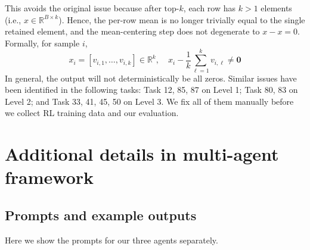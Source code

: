 This avoids the original issue because after $\mathrm{top}\text{-}k$, each row has $k>1$ elements (i.e., $x \in \mathbb{R}^{B \times k}$). Hence, the per-row mean is no longer trivially equal to the single retained element, and the mean-centering step does not degenerate to $x - x = 0$. Formally, for sample $i$,
\[
x_i = [v_{i,1}, \ldots, v_{i,k}] \in \mathbb{R}^k,\quad
x_i - \frac{1}{k}\sum_{\ell=1}^k v_{i,\ell} \neq \mathbf{0}
\]
In general, the output will not deterministically be all zeros.
Similar issues have been identified in the following tasks: Task 12, 85, 87 on Level 1; Task 80, 83 on Level 2; and Task 33, 41, 45, 50 on Level 3. We fix all of them manually before we collect RL training data and our evaluation.



\section{Additional details in multi-agent framework}
\subsection{Prompts and example outputs}
\label{app:prompt}
Here we show the prompts for our three agents separately. 

